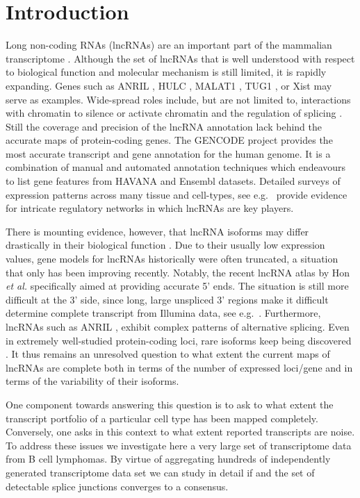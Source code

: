 \documentclass[ncrna,article,submit,moreauthors,pdftex,10pt,a4paper]{mdpi}
\begin{document}
\section{Introduction}

Long non-coding RNAs (lncRNAs) are an important part of the mammalian
transcriptome \cite{Clark:11a,ENCODE:12}. Although the set of lncRNAs that
is well understood with respect to biological function and molecular
mechanism is still limited, it is rapidly expanding. Genes such as ANRIL
\cite{Li:16A,Aguilo:16}, HULC \cite{Yu:17}, MALAT1 \cite{Liu:17}, TUG1
\cite{Li:16}, or Xist \cite{daRocha:17} may serve as examples. Wide-spread
roles include, but are not limited to, interactions with chromatin to
silence or activate chromatin \cite{guttmannat2012,Deng:16} and the
regulation of splicing \cite{Luco:16}. Still the coverage and precision of
the lncRNA annotation lack behind the accurate maps of protein-coding
genes.  The GENCODE project \cite{harrow2012} provides the most accurate
transcript and gene annotation for the human genome. It is a combination of
manual and automated annotation techniques which endeavours to list gene
features from HAVANA and Ensembl datasets. Detailed surveys of expression
patterns across many tissue and cell-types, see e.g.\
\cite{cabili2011,MasPonte:17,Hon:17} provide evidence for intricate
regulatory networks in which lncRNAs are key players.

There is mounting evidence, however, that lncRNA isoforms may differ
drastically in their biological function \cite{Holdt:13a,Bozgeyik:16}. Due
to their usually low expression values, gene models for lncRNAs
historically were often truncated, a situation that only has been improving
recently.  Notably, the recent lncRNA atlas by Hon \emph{et al.}
\cite{Hon:17} specifically aimed at providing accurate 5' ends. The
situation is still more difficult at the 3' side, since long, large
unspliced 3' regions make it difficult determine complete transcript from
Illumina data, see e.g.\ \cite{Mercer:10,Engelhardt:15a}. Furthermore,
lncRNAs such as ANRIL \cite{Holdt:13a}, exhibit complex patterns of
alternative splicing. Even in extremely well-studied protein-coding loci,
rare isoforms keep being discovered \cite{Hoffmann:14a}. It thus remains an
unresolved question to what extent the current maps of lncRNAs are complete
both in terms of the number of expressed loci/gene and in terms of the
variability of their isoforms.

One component towards answering this question is to ask to what extent the
transcript portfolio of a particular cell type has been mapped completely.
Conversely, one asks in this context to what extent reported transcripts
are noise. To address these issues we investigate here a very large set of
transcriptome data from B cell lymphomas. By virtue of aggregating hundreds
of independently generated transcriptome data set we can study in detail if
and the set of detectable splice junctions converges to a consensus.
\end{document}
